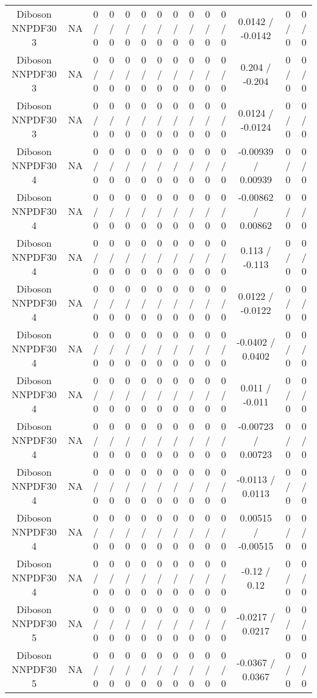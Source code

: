 \documentclass[10pt]{article}
\begin{document}
\begin{table}[htbp]
\begin{center}
\begin{tabular}{|c|c|c|c|c|c|c|c|c|c|c|c|c|c|}
  Diboson NNPDF30 3 &    NA    & 0 / 0 & 0 / 0 & 0 / 0 & 0 / 0 & 0 / 0 & 0 / 0 & 0 / 0 & 0 / 0 & 0 / 0 & 0.0142 / -0.0142 & 0 / 0 & 0 / 0 \\ 
  Diboson NNPDF30 3 &    NA    & 0 / 0 & 0 / 0 & 0 / 0 & 0 / 0 & 0 / 0 & 0 / 0 & 0 / 0 & 0 / 0 & 0 / 0 & 0.204 / -0.204 & 0 / 0 & 0 / 0 \\ 
  Diboson NNPDF30 3 &    NA    & 0 / 0 & 0 / 0 & 0 / 0 & 0 / 0 & 0 / 0 & 0 / 0 & 0 / 0 & 0 / 0 & 0 / 0 & 0.0124 / -0.0124 & 0 / 0 & 0 / 0 \\ 
  Diboson NNPDF30 4 &    NA    & 0 / 0 & 0 / 0 & 0 / 0 & 0 / 0 & 0 / 0 & 0 / 0 & 0 / 0 & 0 / 0 & 0 / 0 & -0.00939 / 0.00939 & 0 / 0 & 0 / 0 \\ 
  Diboson NNPDF30 4 &    NA    & 0 / 0 & 0 / 0 & 0 / 0 & 0 / 0 & 0 / 0 & 0 / 0 & 0 / 0 & 0 / 0 & 0 / 0 & -0.00862 / 0.00862 & 0 / 0 & 0 / 0 \\ 
  Diboson NNPDF30 4 &    NA    & 0 / 0 & 0 / 0 & 0 / 0 & 0 / 0 & 0 / 0 & 0 / 0 & 0 / 0 & 0 / 0 & 0 / 0 & 0.113 / -0.113 & 0 / 0 & 0 / 0 \\ 
  Diboson NNPDF30 4 &    NA    & 0 / 0 & 0 / 0 & 0 / 0 & 0 / 0 & 0 / 0 & 0 / 0 & 0 / 0 & 0 / 0 & 0 / 0 & 0.0122 / -0.0122 & 0 / 0 & 0 / 0 \\ 
  Diboson NNPDF30 4 &    NA    & 0 / 0 & 0 / 0 & 0 / 0 & 0 / 0 & 0 / 0 & 0 / 0 & 0 / 0 & 0 / 0 & 0 / 0 & -0.0402 / 0.0402 & 0 / 0 & 0 / 0 \\ 
  Diboson NNPDF30 4 &    NA    & 0 / 0 & 0 / 0 & 0 / 0 & 0 / 0 & 0 / 0 & 0 / 0 & 0 / 0 & 0 / 0 & 0 / 0 & 0.011 / -0.011 & 0 / 0 & 0 / 0 \\ 
  Diboson NNPDF30 4 &    NA    & 0 / 0 & 0 / 0 & 0 / 0 & 0 / 0 & 0 / 0 & 0 / 0 & 0 / 0 & 0 / 0 & 0 / 0 & -0.00723 / 0.00723 & 0 / 0 & 0 / 0 \\ 
  Diboson NNPDF30 4 &    NA    & 0 / 0 & 0 / 0 & 0 / 0 & 0 / 0 & 0 / 0 & 0 / 0 & 0 / 0 & 0 / 0 & 0 / 0 & -0.0113 / 0.0113 & 0 / 0 & 0 / 0 \\ 
  Diboson NNPDF30 4 &    NA    & 0 / 0 & 0 / 0 & 0 / 0 & 0 / 0 & 0 / 0 & 0 / 0 & 0 / 0 & 0 / 0 & 0 / 0 & 0.00515 / -0.00515 & 0 / 0 & 0 / 0 \\ 
  Diboson NNPDF30 4 &    NA    & 0 / 0 & 0 / 0 & 0 / 0 & 0 / 0 & 0 / 0 & 0 / 0 & 0 / 0 & 0 / 0 & 0 / 0 & -0.12 / 0.12 & 0 / 0 & 0 / 0 \\ 
  Diboson NNPDF30 5 &    NA    & 0 / 0 & 0 / 0 & 0 / 0 & 0 / 0 & 0 / 0 & 0 / 0 & 0 / 0 & 0 / 0 & 0 / 0 & -0.0217 / 0.0217 & 0 / 0 & 0 / 0 \\ 
  Diboson NNPDF30 5 &    NA    & 0 / 0 & 0 / 0 & 0 / 0 & 0 / 0 & 0 / 0 & 0 / 0 & 0 / 0 & 0 / 0 & 0 / 0 & -0.0367 / 0.0367 & 0 / 0 & 0 / 0 \\ 

\end{tabular}
\end{center}
\end{table}
\end{document}
